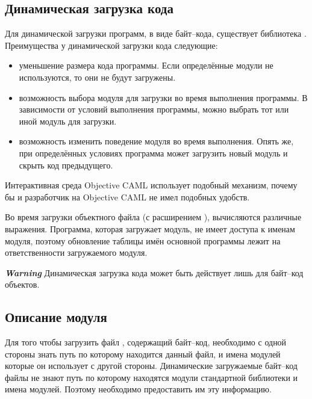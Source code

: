 \subsection{Динамическая загрузка кода}
\label{subsec:dynamic_loading_of_code}

Для динамической загрузки программ, в виде байт–кода, существует библиотека 
. Преимущества у динамической загрузки кода следующие:

\begin{itemize}
	\item уменьшение размера кода программы. Если определённые модули не 
используются, то они не будут загружены.

	\item возможность выбора модуля для загрузки во время выполнения программы. 
В зависимости от условий выполнения программы, можно выбрать тот или иной модуль 
для загрузки. 

	\item     возможность изменить поведение модуля во время выполнения. Опять 
же, при определённых условиях программа может загрузить новый модуль и скрыть 
код предыдущего.
\end{itemize}

Интерактивная среда Objective CAML использует подобный механизм, почему бы и 
разработчик на Objective CAML не имел подобных удобств.

Во время загрузки объектного файла (с расширением ), вычисляются 
различные выражения. Программа, которая загружает модуль, не имеет доступа к 
именам модуля, поэтому обновление таблицы имён основной программы лежит на 
ответственности загружаемого модуля.

{\it \bf Warning}
Динамическая загрузка кода может быть действует лишь для байт--код объектов.

\subsection{Описание модуля}
\label{subsubsec:description_of_the_module}

Для того чтобы загрузить файл , содержащий байт--код, необходимо с 
одной стороны знать путь по которому находится данный файл, и имена модулей 
которые он использует с другой стороны. Динамические загружаемые байт--код 
файлы не знают путь по которому находятся модули стандартной библиотеки и имена 
модулей. Поэтому необходимо предоставить им эту информацию. 

